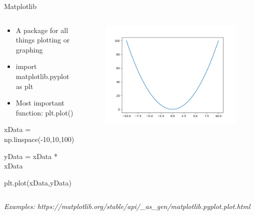 \documentclass[10pt, aspectratio=169]{beamer}
\begin{document}
\begin{frame}{Matplotlib}
    \begin{columns}
        \begin{column}{0.5\textwidth}
            \begin{itemize}
                \item A package for all things plotting or graphing
                \item import matplotlib.pyplot as plt
                \item Most important function: plt.plot()
            \end{itemize}
        
            \vspace{0.5cm}
        
            xData = np.linspace(-10,10,100)
        
            yData = xData * xData
        
            \vspace{0.25cm}
        
            plt.plot(xData,yData)
        \end{column}
        \begin{column}{0.5\textwidth}
            \begin{figure}
                \includegraphics[width=\linewidth]{Quadratic.png}
            \end{figure}
        \end{column}
    \end{columns}

    \vspace{0.25cm}
    \textit{Examples: https://matplotlib.org/stable/api/\_as\_gen/matplotlib.pyplot.plot.html}
\end{frame}
\end{document}
